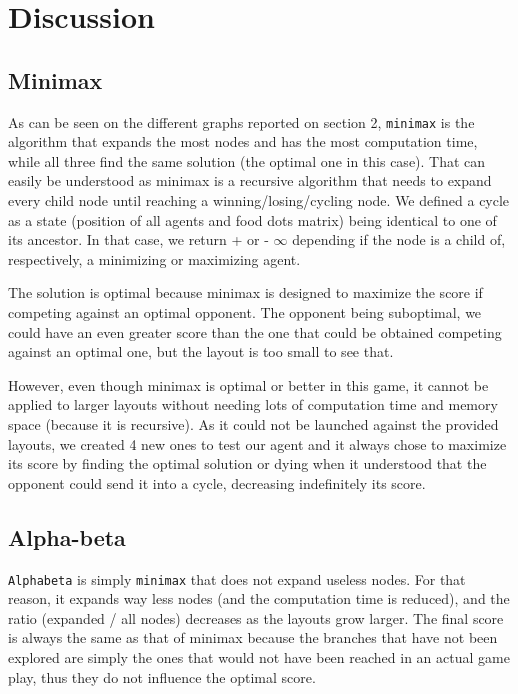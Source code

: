 \documentclass[a4paper, 11pt]{article}
\begin{document}
	
	\section{Discussion}
	
	\subsection{Minimax}
	
	As can be seen on the different graphs reported on section 2, \texttt{minimax} is the algorithm that expands the most nodes and has the most computation time, while all three find the same solution (the optimal one in this case). That can easily be understood as minimax is a recursive algorithm that needs to expand every child node until reaching a winning/losing/cycling node. We defined a cycle as a state (position of all agents and food dots matrix) being identical to one of its ancestor. In that case, we return + or - $\infty$ depending if the node is a child of, respectively, a minimizing or maximizing agent. 
	
	The solution is optimal because minimax is designed to maximize the score if competing against an optimal opponent. The opponent being suboptimal, we could have an even greater score than the one that could be obtained competing against an optimal one, but the layout is too small to see that. 
	
	However, even though minimax is optimal or better in this game, it cannot be applied to larger layouts without needing lots of computation time and memory space (because it is recursive). As it could not be launched against the provided layouts, we created 4 new ones to test our agent and it always chose to maximize its score by finding the optimal solution or dying when it understood that the opponent could send it into a cycle, decreasing indefinitely its score.
	
	\subsection{Alpha-beta}
	
	\texttt{Alphabeta} is simply \texttt{minimax} that does not expand useless nodes. For that reason, it expands way less nodes (and the computation time is reduced), and the ratio (expanded / all nodes) decreases as the layouts grow larger. The final score is always the same as that of minimax because the branches that have not been explored are simply the ones that would not have been reached in an actual game play, thus they do not influence the optimal score.
	
\end{document}
